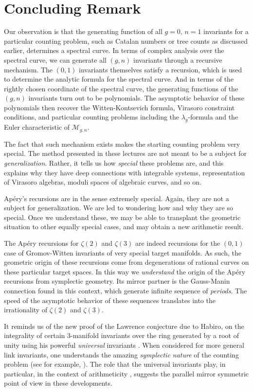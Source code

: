 \documentclass{amsart}
\theoremstyle{definition}
\numberwithin{equation}{section}
\numberwithin{figure}{section}
\def\lam{\lambda}
\newcommand{\cM}{{\mathcal{M}}}
\begin{document}
\section{Concluding Remark}

Our observation is that the generating function of all $g=0$, $n=1$ invariants
for a particular counting problem,
such as Catalan numbers or tree counts as discussed earlier, determines
a spectral curve. In terms of complex analysis over the spectral curve, 
we can generate all $(g,n)$ invariants through a recursive mechanism.
The $(0,1)$ invariants themselves satisfy a recursion, which 
is used to determine the analytic formula for the spectral curve.
And in terms of the rightly chosen  coordinate of the spectral curve,
the generating functions of the $(g,n)$ invariants turn out to be polynomials.
The asymptotic behavior of these polynomials then recover 
the Witten-Kontsevich formula, Virasoro constraint conditions,
and particular counting problems including the $\lam_g$-formula
and the Euler characteristic of $\cM_{g,n}$.


The fact that such mechanism exists makes the starting counting problem
very special. The method presented in these lectures are not meant to be
a subject for \emph{generalization}. Rather, it tells us how \emph{special}
these problems are, and this explains why they have 
deep connections with 
integrable systems, representation of Virasoro algebras,  moduli spaces of 
algebraic curves,  and so on.

Ap\'ery's recursions are in the sense extremely special. Again, they are not
a subject for  generalization. We are led to wondering how and why they
are so special. Once we understand these, we may be able to transplant 
the geometric situation to other equally special cases, and may obtain a new
arithmetic result. 

The Ap\'ery recursions for $\zeta(2)$ and $\zeta(3)$ 
are indeed recursions for the $(0,1)$ case of 
Gromov-Witten invariants of very special target manifolds. As such, the geometric 
origin of these recursions come from degenerations of rational curves
on these particular target spaces. In this way we \emph{understand} the 
origin of the Ap\'ery recursions from symplectic geometry. Its mirror partner
is the Gauss-Manin connection found in this  context, which
generate infinite sequence of \emph{periods}. The speed of the 
asymptotic behavior of these sequences translates into the irrationality of
$\zeta(2)$ and $\zeta(3)$.

It reminds us of the new proof of the Lawrence conjecture \cite{Lawrence}
due to Habiro,
on the integrality of certain $3$-manifold invariants over the ring generated by 
a root of unity  using his powerful \emph{universal} invariants
\cite{Habiro}. When considered for more general link invariants, one 
understands  the amazing \emph{symplectic nature} of the counting problem
(see for example, \cite{Cristina}). The role that the universal invariants 
play, in particular, in the context of arithmeticity \cite{GSWZ}, suggests
the parallel mirror symmetric point of view in these developments. 
\end{document}
